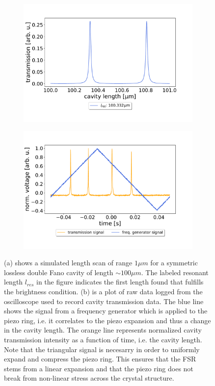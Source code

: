 \begin{figure}[h!]
    \centering
    \begin{subfigure}[b]{0.49\textwidth}
        \includegraphics[width=\textwidth]{figures/length_scan_symmetric_lossless.pdf}
        \caption{}
        \label{fig:length_scan_sim}
    \end{subfigure}
    \begin{subfigure}[b]{0.49\textwidth}
        \includegraphics[width=\textwidth]{figures/scope_screenshot.pdf}
        \caption{}
        \label{fig:lenght_scan_scope}
    \end{subfigure}
    \caption{(a) shows a simulated length scan  of range $1 \mu m$ for a symmetric lossless double Fano cavity of length $\sim 100 \mu m$. The labeled resonant length $l_{res}$ in the figure indicates the first length found that fulfills the brightness condition. (b) is a plot of raw data logged from the oscilloscope used to record cavity transmission data. The blue line shows the signal from a frequency generator which is applied to the piezo ring, i.e. it correlates to the piezo expansion and thus a change in the cavity length. The orange line represents normalized cavity transmission intensity as a function of time, i.e. the cavity length. Note that the triangular signal is necesarry in order to uniformly expand and compress the piezo ring. This ensures that the FSR stems from a linear expansion and that the piezo ring does not break from non-linear stress across the crystal structure.}
    \label{fig:length_scan}
\end{figure}
